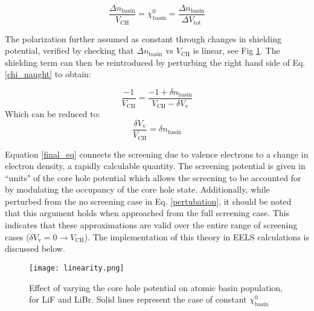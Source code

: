 \begin{equation}
\frac{\Delta n _{\mathrm{basin}}}{V_{\mathrm{CH}}} = \chi^0_{\mathrm{basin}} = \frac{\Delta n _{\mathrm{basin}}}{\Delta V_{\mathrm{tot}}}
\label{chi_naught}
\end{equation}

The polarization further assumed as constant through changes in shielding potential, verified by checking that $\Delta n _{\mathrm{basin}}$ vs $V_{\mathrm{CH}}$ is linear, see Fig \ref{linearity}. The shielding term can then be reintroduced by perturbing the right hand side of Eq. \ref{chi_naught} to obtain: 


\begin{equation}
\frac{-1}{V_{\mathrm{CH}}} = \frac{-1+\delta n_{\mathrm{basin}}}{V_{\mathrm{CH}}-\delta V_{\mathrm{v}}}
\label{pertubation}
\end{equation}
Which can be reduced to:
\begin{equation}
\frac{\delta V_{\mathrm{v}}}{V_{\mathrm{CH}}} = \delta n_{\mathrm{basin}}
\label{final_eq}
\end{equation}

Equation \ref{final_eq} connects the screening due to valence electrons to a change in electron density, a rapidly calculable quantity.  The screening potential is given in ``units" of the core hole potential which allows the screening to be accounted for by modulating the occupancy of the core hole state.  Additionally, while perturbed from the no screening case in Eq. \ref{pertubation}, it should be noted that this argument holds when approached from the full screening case.  This indicates that these approximations are valid over the entire range of screening cases ($\delta V_{\mathrm{v}} = 0 \to V_{\mathrm{CH}}$).  The implementation of this theory in EELS calculations is discussed below.  

\begin{figure}
	\centering
	\texttt{[image: linearity.png]}
	\caption{Effect  of varying the core hole potential on atomic basin population, for LiF and LiBr.  Solid lines represent the case of constant $\chi^0_{\mathrm{basin}}$}
	\label{linearity}
	
\end{figure}

